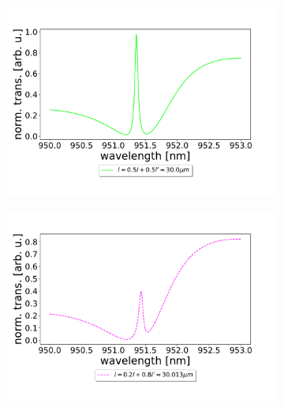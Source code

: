 \begin{figure}[h!]
    \centering
    \begin{subfigure}[b]{0.49\textwidth}
        \centering
        \includegraphics[width=\textwidth]{figures/cmap_slice1.pdf}
        \caption{}
        \label{fig:cmap_slice1}
    \end{subfigure}
    \begin{subfigure}[b]{0.49\textwidth}
        \centering
        \includegraphics[width=\textwidth]{figures/cmap_slice2.pdf}
        \caption{}
        \label{fig:cmap_slice2}
    \end{subfigure}
    \begin{subfigure}[b]{0.49\textwidth}
        \centering

\end{subfigure}
\end{figure}
